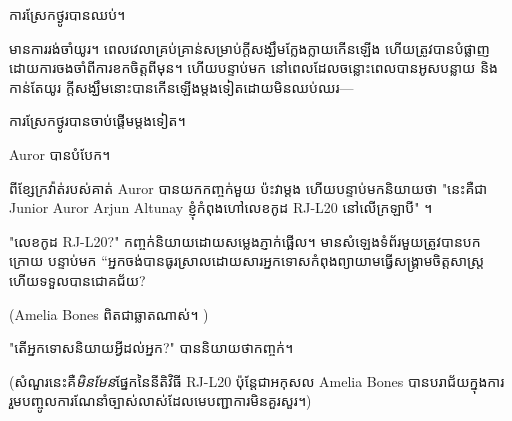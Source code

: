ការស្រែកថ្ងូរបានឈប់។

មានការរង់ចាំយូរ។ ពេលវេលាគ្រប់គ្រាន់សម្រាប់ក្តីសង្ឃឹមក្លែងក្លាយកើនឡើង ហើយត្រូវបានបំផ្លាញដោយការចងចាំពីការខកចិត្តពីមុន។ ហើយបន្ទាប់មក នៅពេលដែលចន្លោះពេលបានអូសបន្លាយ និងកាន់តែយូរ ក្តីសង្ឃឹមនោះបានកើនឡើងម្តងទៀតដោយមិនឈប់ឈរ—

ការស្រែកថ្ងូរបានចាប់ផ្តើមម្តងទៀត។

Auror បានបំបែក។

ពីខ្សែក្រវ៉ាត់របស់គាត់ Auror បានយកកញ្ចក់មួយ ប៉ះវាម្តង ហើយបន្ទាប់មកនិយាយថា "នេះគឺជា Junior Auror Arjun Altunay ខ្ញុំកំពុងហៅលេខកូដ RJ-L20 នៅលើក្រឡាបី" ។

"លេខកូដ RJ-L20?" កញ្ចក់និយាយដោយសម្លេងភ្ញាក់ផ្អើល។ មាន​សំឡេង​ទំព័រ​មួយ​ត្រូវ​បាន​បក​ក្រោយ បន្ទាប់​មក “អ្នក​ចង់​បាន​ធូរស្រាល​ដោយសារ​អ្នក​ទោស​កំពុង​ព្យាយាម​ធ្វើ​សង្គ្រាម​ចិត្តសាស្ត្រ ហើយ​ទទួល​បាន​ជោគជ័យ?

(Amelia Bones ពិតជាឆ្លាតណាស់។ )

"តើអ្នកទោសនិយាយអ្វីដល់អ្នក?" បាននិយាយថាកញ្ចក់។

(សំណួរនេះគឺ\emph{មិនមែន}ផ្នែកនៃនីតិវិធី RJ-L20 ប៉ុន្តែជាអកុសល Amelia Bones បានបរាជ័យក្នុងការរួមបញ្ចូលការណែនាំច្បាស់លាស់ដែលមេបញ្ជាការមិនគួរសួរ។)

